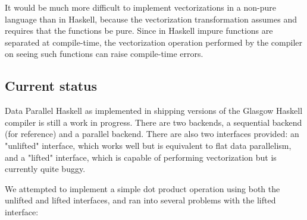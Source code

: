 \documentclass[a4paper]{acmtrans2m}
\begin{document}
It would be much more difficult to implement vectorizations in a non-pure
language than in Haskell, because the vectorization transformation assumes and
requires that the functions be pure. Since in Haskell impure functions are 
separated at compile-time, the vectorization operation performed by the compiler
on seeing such functions can raise compile-time errors.

\subsection{Current status}
Data Parallel Haskell as implemented in shipping versions of the Glasgow Haskell
compiler is still a work in progress. There are two backends, a sequential backend
(for reference) and a parallel backend. There are also two interfaces
provided: an "unlifted" interface, which works well but is equivalent to flat data
parallelism, and a "lifted" interface, which is capable of performing vectorization
but is currently quite buggy.

We attempted to implement a simple dot product operation using both the unlifted and
lifted interfaces, and ran into several problems with the lifted interface:
\end{document}

